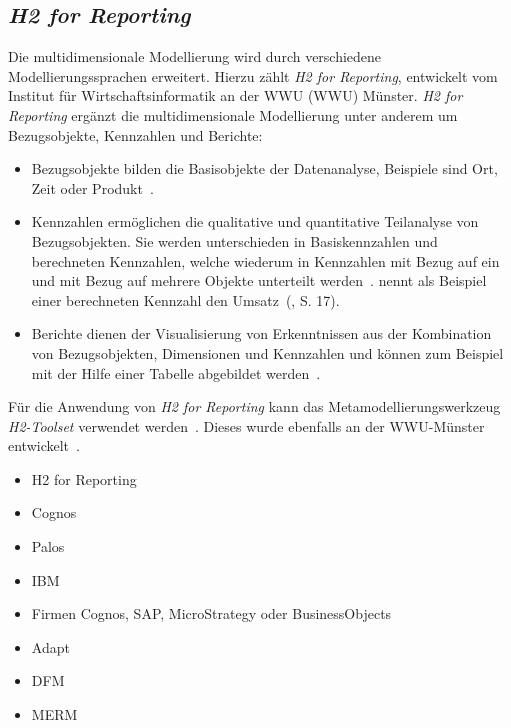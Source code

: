 \documentclass[
  language=german, %
  type=bachelor%
]{isthesis}
\begin{document}
\begin{content}
  \subsection{\textit{H2 for Reporting}}
  Die multidimensionale Modellierung wird durch verschiedene Modellierungssprachen
  erweitert. Hierzu zählt \zB{} \textit{H2 for Reporting}, entwickelt vom
  Institut für Wirtschaftsinformatik an der \acrlong{WWU} (WWU)
  Münster. \textit{H2 for Reporting}
  ergänzt die multidimensionale Modellierung unter anderem um Bezugsobjekte,
  Kennzahlen und Berichte:
  \begin{itemize}
    \item Bezugsobjekte bilden die
      Basisobjekte der Datenanalyse, Beispiele sind Ort, Zeit oder
      Produkt~\cite[][S.  5]{becker2007h2}.

    \item Kennzahlen ermöglichen die qualitative
      und quantitative Teilanalyse von Bezugsobjekten. Sie werden unterschieden in
      Basiskennzahlen und berechneten Kennzahlen, welche wiederum in Kennzahlen mit
      Bezug auf ein und mit Bezug auf mehrere Objekte unterteilt werden~\cite[][S.
      15]{becker2007h2}. \textsc{\citeauthor{becker2007h2}} nennt als Beispiel
      einer berechneten Kennzahl den Umsatz~(\cite{becker2007h2}, S. 17).

    \item Berichte dienen der Visualisierung von Erkenntnissen aus der Kombination von
      Bezugsobjekten, Dimensionen und Kennzahlen und können zum Beispiel mit der
      Hilfe einer Tabelle abgebildet werden~\cite[][S. 23]{becker2007h2}.
  \end{itemize}

  Für die Anwendung von \textit{H2 for Reporting} kann das
  Metamodellierungswerkzeug \textit{H2-Toolset} verwendet werden~\cite[][S.
  33]{fleischer2013konstruktion}. Dieses wurde ebenfalls an der
  \acrshort{WWU}-Münster entwickelt~\cite[][S. 34]{becker2007h2}.

  \begin{itemize}
    \item H2 for Reporting
    \item Cognos
    \item Palos
    \item IBM
    \item Firmen Cognos, SAP, MicroStrategy oder BusinessObjects
    \item Adapt
    \item DFM
    \item MERM
  \end{itemize}


\end{content}
\end{document}
